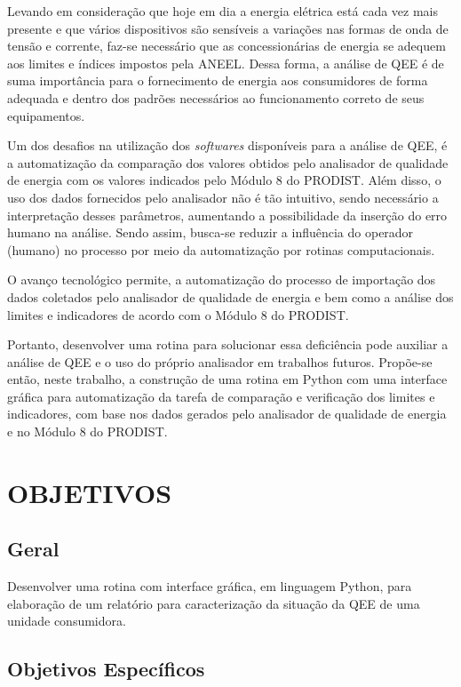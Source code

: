 Levando em consideração que hoje em dia a energia elétrica está cada vez mais presente e que vários dispositivos são sensíveis a variações nas formas de onda de tensão e corrente, faz-se necessário que as concessionárias de energia se adequem aos limites e índices impostos pela ANEEL. Dessa forma, a análise de QEE é de suma importância para o fornecimento de energia aos consumidores de forma adequada e dentro dos padrões necessários ao funcionamento correto de seus equipamentos.

Um dos desafios na utilização dos \textit{softwares} disponíveis para a análise de QEE, é a automatização da comparação dos valores obtidos pelo analisador de qualidade de energia com os valores indicados pelo Módulo 8 do PRODIST. Além disso, o uso dos dados fornecidos pelo analisador não é tão intuitivo, sendo necessário a interpretação desses parâmetros, aumentando a possibilidade da inserção do erro humano na análise. Sendo assim, busca-se reduzir a influência do operador (humano) no processo por meio da automatização por rotinas computacionais.

O avanço tecnológico permite, a automatização do processo de importação dos dados coletados pelo analisador de qualidade de energia e bem como a análise dos limites e indicadores de acordo com o Módulo 8 do PRODIST.

Portanto, desenvolver uma rotina para solucionar essa deficiência pode auxiliar a análise de QEE e o uso do próprio analisador em trabalhos futuros. Propõe-se então, neste trabalho, a construção de uma rotina em Python com uma interface gráfica para automatização da tarefa de comparação e verificação dos limites e indicadores, com base nos dados gerados pelo analisador de qualidade de energia e no Módulo 8 do PRODIST.

\section{OBJETIVOS}

\subsection{Geral}

Desenvolver uma rotina com interface gráfica, em linguagem Python, para elaboração de um relatório para caracterização da situação da QEE de uma unidade consumidora.

\subsection{Objetivos Específicos}

